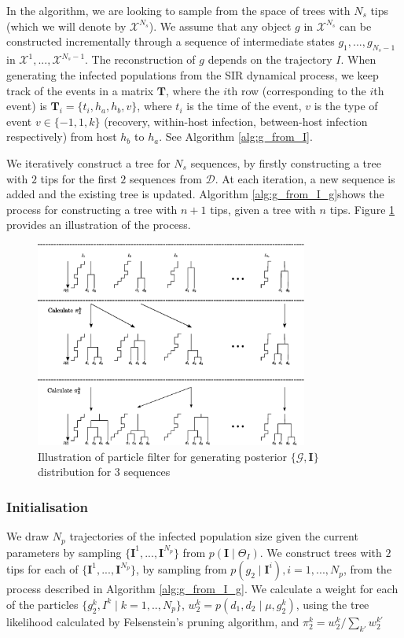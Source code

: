 \documentclass[a4paper,18pt]{report}
\begin{document}
In the algorithm, we are looking to sample from the space of trees with $N_s$ tips (which we will denote by $\mathcal{X}^{N_s}$). We assume that any object $g$ in $\mathcal{X}^{N_s}$ can 
be constructed incrementally through a sequence of intermediate states   ${g}_1,..., {g}_{N_s-1}$ in  $\mathcal{X}^{1}, ..., \mathcal{X}^{N_s -1}$. The reconstruction of $g$ depends on the
trajectory $I$. When generating the infected populations from the SIR dynamical process, we keep track of the events in a matrix $\mathbf{T}$, where the $i$th row (corresponding to the $i$th event) is $\mathbf{T}_i=\{t_i, h_a, h_b, v\}$, where $t_i$ is the time of the event, $v$ is the type of event $v \in \{-1,1, k\}$ (recovery, within-host infection, between-host infection respectively) from host $h_b$ to $h_a$. See Algorithm \ref{alg:g_from_I}.

We iteratively construct a tree for $N_s$ sequences, by firstly constructing a tree with $2$ tips for the first $2$ sequences from $\mathcal{D}$. At each iteration, a new sequence is added and the existing tree is updated. Algorithm \ref{alg:g_from_I_g}shows the process for constructing a tree with $n+1$ tips, given a tree with $n$ tips. Figure \ref{fig:smc} provides an illustration of the process.

\begin{figure}[ht]
\centering
\includegraphics[width=0.8\textwidth]{smc.eps}
\caption{Illustration of particle filter for generating posterior $\{\mathcal{G}, \mathbf{I}\}$ distribution for $3$ sequences\label{fig:smc}}
\end{figure}


\subsubsection{Initialisation}
We draw $N_p$ trajectories of the infected population size given the current parameters by sampling $\{\mathbf{I}^1,..., \mathbf{I}^{N_p}\}$ from $p(\mathbf{I} \mid \Theta_{I})$. We construct trees with $2$ tips for each of $\{\mathbf{I}^1,..., \mathbf{I}^{N_p}\}$,
by sampling from $p(g_2 \mid \mathbf{I}^i), i=1,...,N_p$, from the process described in Algorithm \ref{alg:g_from_I_g}. We calculate a weight for each of the particles $\{g_2^k,  I^k \mid k=1,..,N_p\}$, $w_2^k = p(d_1, d_2 \mid \mu, g_2^k)$, using the tree likelihood calculated by Felsenstein's pruning algorithm, and $\pi_{2}^k = w_{2}^{k} / \sum_{k'} w_{2}^{k'}$
\end{document}
